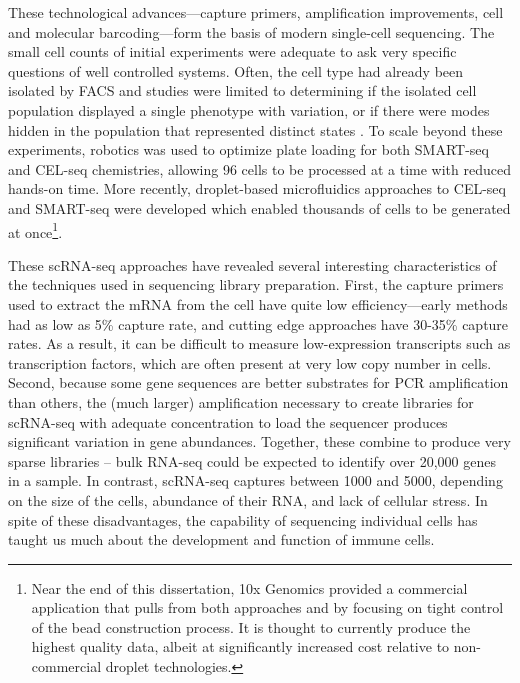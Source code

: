 These technological advances---capture primers, amplification improvements, cell and molecular barcoding---form the basis of modern single-cell sequencing.
The small cell counts of initial experiments were adequate to ask very specific questions of well controlled systems. 
Often, the cell type had already been isolated by FACS and studies were limited to determining if the isolated cell population displayed a single phenotype with variation, or if there were modes hidden in the population that represented distinct states \citep{Shalek2013}.
To scale beyond these experiments, robotics was used to optimize plate loading for both SMART-seq \citep{Shalek2014} and CEL-seq \citep{Jaitin2014} chemistries, allowing 96 cells to be processed at a time with reduced hands-on time. 
More recently, droplet-based microfluidics approaches to CEL-seq \citep{Klein2015} and SMART-seq \citep{Macosko2015} were developed which enabled thousands of cells to be generated at once\footnote{Near the end of this dissertation, 10x Genomics \citep{Zheng2017a} provided a commercial application that pulls from both approaches and by focusing on tight control of the bead construction process. It is thought to currently produce the highest quality data, albeit at significantly increased cost relative to non-commercial droplet technologies.}. 

These scRNA-seq approaches have revealed several interesting characteristics of the techniques used in sequencing library preparation. First, the capture primers used to extract the mRNA from the cell have quite low efficiency---early methods had as low as 5\% capture rate, and cutting edge approaches have 30-35\% capture rates. 
As a result, it can be difficult to measure low-expression transcripts such as transcription factors, which are often present at very low copy number in cells. 
Second, because some gene sequences are better substrates for PCR amplification than others, the (much larger) amplification necessary to create libraries for scRNA-seq with adequate concentration to load the sequencer produces significant variation in gene abundances. 
Together, these combine to produce very sparse libraries -- bulk RNA-seq could be expected to identify over 20,000 genes in a sample. 
In contrast, scRNA-seq captures between 1000 and 5000, depending on the size of the cells, abundance of their RNA, and lack of cellular stress. 
In spite of these disadvantages, the capability of sequencing individual cells has taught us much about the development and function of immune cells. 

